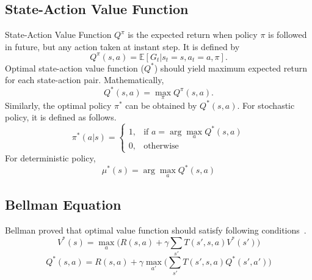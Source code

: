 \subsection{State-Action Value Function}

State-Action Value Function $Q^{\pi}$ is the expected return when policy $\pi$ is followed in future, 
but any action taken at instant step. It is defined by
\begin{equation}
Q^{\pi}(s,a) = \mathbb{E}[G_t|s_t=s, a_t=a, \pi]. %
\end{equation}
Optimal state-action value function ($Q^{*}$) should yield maximum expected return for each state-action pair. 
Mathematically,  
\begin{equation}
Q^{*}(s,a) = \max_{\pi} Q^{\pi}(s,a).
\end{equation}
Similarly, the optimal policy $\pi^*$ can be obtained by $Q^{*}(s,a)$. For stochastic policy, it is defined as follows.
\begin{equation}
\label{eqn:policy_stochastic_q}
\pi^{*}(a|s) = 
\begin{cases}
1,   & \text{if  } a = \arg\max_{a} Q^{*}(s,a) \\
0,   & \text{otherwise  }
\end{cases} 
\end{equation}
For deterministic policy, 
\begin{equation}
\label{eqn:policy_deterministic_q}
\mu^{*}(s) = \arg\max_{a} Q^{*}(s,a)
\end{equation}

\subsection{Bellman Equation}

Bellman proved that optimal value function should satisfy following conditions~\cite{bellman_dynamic_2003}. 
\begin{equation}
\label{eqn:bellman_v}
V^{*}(s) = \max_{a} \big( R(s,a) + \gamma \sum_{s'} T(s',s,a) V^{*}(s') \big)
\end{equation}
\begin{equation}
\label{eqn:bellman_q}
Q^{*}(s,a) = R(s,a) + \gamma \max_{a'} \big( \sum_{s'} T(s',s,a) Q^{*}(s',a') \big)
\end{equation}
